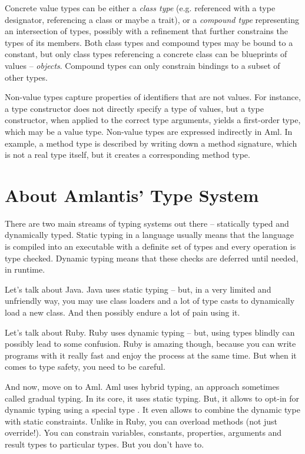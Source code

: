 Concrete value types can be either a \textit{class type} (e.g. referenced with a type designator, referencing a class or maybe a trait), or a \textit{compound type} representing an intersection of types, possibly with a refinement that further constrains the types of its members. Both class types and compound types may be bound to a constant, but only class types referencing a concrete class can be blueprints of values -- \textit{objects}. Compound types can only constrain bindings to a subset of other types. 

Non-value types capture properties of identifiers that are not values. For instance, a type constructor does not directly specify a type of values, but a type constructor, when applied to the correct type arguments, yields a first-order type, which may be a value type. Non-value types are expressed indirectly in Aml. In example, a method type is described by writing down a method signature, which is not a real type itself, but it creates a corresponding method type. 






\section{About Amlantis' Type System}

There are two main streams of typing systems out there -- statically typed and dynamically typed. Static typing in a language usually means that the language is compiled into an executable with a definite set of types and every operation is type checked. Dynamic typing means that these checks are deferred until needed, in runtime. 

Let's talk about Java. Java uses static typing -- but, in a very limited and unfriendly way, you may use class loaders and a lot of type casts to dynamically load a new class. And then possibly endure a lot of pain using it. 

Let's talk about Ruby. Ruby uses dynamic typing -- but, using types blindly can possibly lead to some confusion. Ruby is amazing though, because you can write programs with it really fast and enjoy the process at the same time. But when it comes to type safety, you need to be careful. 

And now, move on to Aml. Aml uses hybrid typing, an approach sometimes called gradual typing. In its core, it uses static typing. But, it allows to opt-in for dynamic typing using a special type . It even allows to combine the dynamic type with static constraints. Unlike in Ruby, you can overload methods (not just override!). You can constrain variables, constants, properties, arguments and result types to particular types. But you don't have to. 

